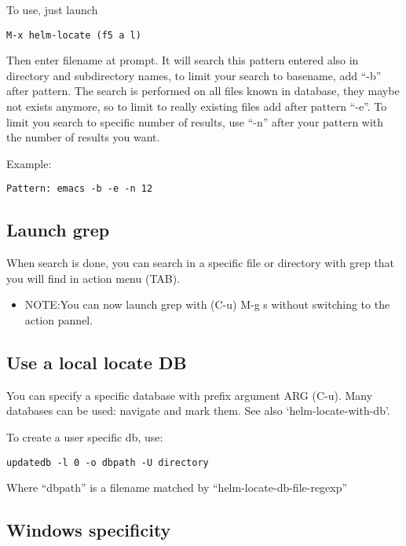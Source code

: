 \documentclass[a4paper,11pt]{article}
\begin{document}
To use, just launch 
\begin{verbatim}
M-x helm-locate (f5 a l)
\end{verbatim}

Then enter filename at prompt.
It will search this pattern entered also in directory and subdirectory names, to limit your search to basename,
add ``-b'' after pattern.
The search is performed on all files known in database, they maybe not exists anymore, so to limit to
really existing files add after pattern ``-e''.
To limit you search to specific number of results, use ``-n'' after your pattern with the number of results
you want.

Example:
\begin{verbatim}
Pattern: emacs -b -e -n 12
\end{verbatim}

\subsection{Launch grep}
\label{sec:launch-grep}

When search is done, you can search in a specific file or directory with grep that you will find in action menu (TAB).\\

\begin{itemize}
\item NOTE:You can now launch grep with (C-u) M-g s without switching to the action pannel.
\end{itemize}

\subsection{Use a local locate DB}
\label{sec:use-local-locate}

You can specify a specific database with prefix argument ARG (C-u).
Many databases can be used: navigate and mark them.
See also `helm-locate-with-db'.

To create a user specific db, use:
\begin{verbatim}
updatedb -l 0 -o dbpath -U directory
\end{verbatim}

Where ``dbpath'' is a filename matched by
``helm-locate-db-file-regexp''

\subsection{Windows specificity}
\label{sec:windows-specificity}
\end{document}
